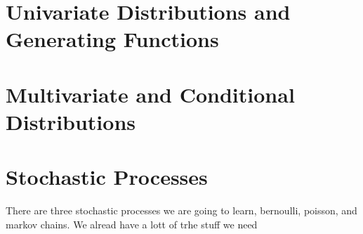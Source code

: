 \documentclass{report}
\begin{document}
    \newcommand{\todo}{TODO\quad}
    
    \tableofcontents
    
    \chapter{Univariate Distributions and Generating Functions}
    
    
    
    
    
    
    
    
    
    
    
    
    \chapter{Multivariate and Conditional Distributions}
    
    \chapter{Stochastic Processes}
    
    There are three stochastic processes we are going to learn, bernoulli, poisson, and markov chains. We alread have a lott of trhe stuff we need
    
\end{document}
